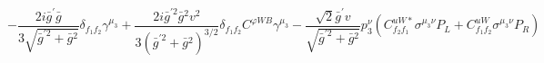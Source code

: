 %
\begin{dmath*}
%
  -  \frac{2 i {\bar g}^\prime {\bar g}{}}{3 \sqrt{{\bar g}^{\prime 2} + {\bar g}{}^2}}\delta_{f_1 f_2}  \gamma^{\mu_3}  +  \frac{2 i {\bar g}^{\prime 2} {\bar g}{}^2 v^2}{3 \left({\bar g}^{\prime 2} + {\bar g}{}^2\right)^{3/2}}\delta_{f_1 f_2}  C^{ \varphi  WB} \gamma^{\mu_3}  -  \frac{\sqrt{2} {\bar g}^\prime v}{\sqrt{{\bar g}^{\prime 2} + {\bar g}{}^2}} p_3^{\nu} \left(C^{uW*}_{f_2 f_1} \sigma^{\mu_3 \nu } P_L  + C^{uW}_{f_1 f_2} \sigma^{\mu_3 \nu } P_R \right)
%
\end{dmath*}
%
